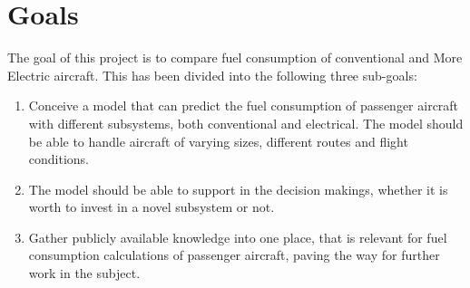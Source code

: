 \documentclass[english]{kththesis}
\begin{document}
\section{Goals}
%
%
%
%
The goal of this project is to compare fuel consumption of conventional and More Electric aircraft. This has been divided into the following three sub-goals:

\begin{enumerate}
\item Conceive a model that can predict the fuel consumption of passenger aircraft with different subsystems, both conventional and electrical. The model should be able to handle aircraft of varying sizes, different routes and flight conditions.
\item The model should be able to support in the decision makings, whether it is worth to invest in a novel subsystem or not.
\item Gather publicly available knowledge into one place, that is relevant for fuel consumption calculations of passenger aircraft, paving the way for further work in the subject.
\end{enumerate}
\end{document}
